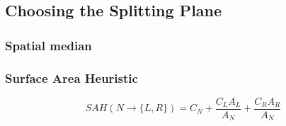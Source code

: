 

\subsection{Choosing the Splitting Plane}\label{sec:splittingPlane}







\subsubsection{Spatial median}







\subsubsection{Surface Area Heuristic}



\begin{displaymath}
  SAH(N \rightarrow \{L, R\}) = C_N + \frac{C_L A_L}{A_N} +
  \frac{C_R A_R}{A_N}
\end{displaymath}

